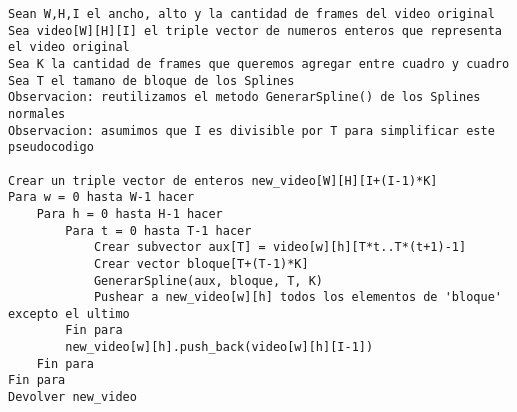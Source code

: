 \begin{lstlisting}
Sean W,H,I el ancho, alto y la cantidad de frames del video original
Sea video[W][H][I] el triple vector de numeros enteros que representa el video original
Sea K la cantidad de frames que queremos agregar entre cuadro y cuadro
Sea T el tamano de bloque de los Splines
Observacion: reutilizamos el metodo GenerarSpline() de los Splines normales
Observacion: asumimos que I es divisible por T para simplificar este pseudocodigo

Crear un triple vector de enteros new_video[W][H][I+(I-1)*K]
Para w = 0 hasta W-1 hacer
	Para h = 0 hasta H-1 hacer
		Para t = 0 hasta T-1 hacer
			Crear subvector aux[T] = video[w][h][T*t..T*(t+1)-1]
			Crear vector bloque[T+(T-1)*K]
			GenerarSpline(aux, bloque, T, K)
			Pushear a new_video[w][h] todos los elementos de 'bloque' excepto el ultimo
		Fin para
		new_video[w][h].push_back(video[w][h][I-1])
	Fin para
Fin para
Devolver new_video
\end{lstlisting}
